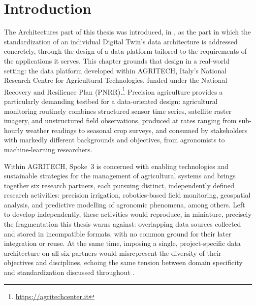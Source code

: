 \section{Introduction}

The Architectures part of this thesis was introduced, in , as the part in which the standardization of an individual Digital Twin's data architecture is addressed concretely, through the design of a data platform tailored to the requirements of the applications it serves. This chapter grounds that design in a real-world setting: the data platform developed within AGRITECH, Italy's National Research Centre for Agricultural Technologies, funded under the National Recovery and Resilience Plan (PNRR).\footnote{\url{https://agritechcenter.it}} Precision agriculture provides a particularly demanding testbed for a data-oriented design: agricultural monitoring routinely combines structured sensor time series, satellite raster imagery, and unstructured field observations, produced at rates ranging from sub-hourly weather readings to seasonal crop surveys, and consumed by stakeholders with markedly different backgrounds and objectives, from agronomists to machine-learning researchers.

Within AGRITECH, Spoke~3 is concerned with enabling technologies and sustainable strategies for the management of agricultural systems and brings together six research partners, each pursuing distinct, independently defined research activities: precision irrigation, robotics-based field monitoring, geospatial analysis, and predictive modelling of agronomic phenomena, among others. Left to develop independently, these activities would reproduce, in miniature, precisely the fragmentation this thesis warns against: overlapping data sources collected and stored in incompatible formats, with no common ground for their later integration or reuse. At the same time, imposing a single, project-specific data architecture on all six partners would misrepresent the diversity of their objectives and disciplines, echoing the same tension between domain specificity and standardization discussed throughout .

